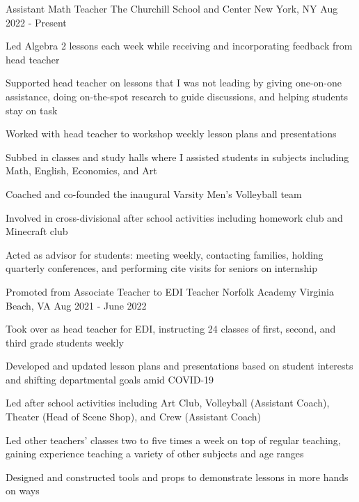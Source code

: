 \begin{cventries}
  \cventry
  {Assistant Math Teacher}
  {The Churchill School and Center}
  {New York, NY}
  {Aug 2022 - Present}
  {
    \begin{cvitems}
      \item {Led Algebra 2 lessons each week while receiving and incorporating feedback from head teacher}
      \item {Supported head teacher on lessons that I was not leading by giving one-on-one assistance, doing on-the-spot research to guide discussions, and helping students stay on task}
      \item {Worked with head teacher to workshop weekly lesson plans and presentations}
      \item {Subbed in classes and study halls where I assisted students in subjects including Math, English, Economics, and Art}
      \item {Coached and co-founded the inaugural Varsity Men's Volleyball team}
      \item {Involved in cross-divisional after school activities including homework club and Minecraft club}
      \item {Acted as advisor for students: meeting weekly, contacting families, holding quarterly conferences, and performing cite visits for seniors on internship}
    \end{cvitems}
  }

  \cventry
  {Promoted from Associate Teacher to EDI Teacher}
  {Norfolk Academy}
  {Virginia Beach, VA}
  {Aug 2021 - June 2022}
  {
    \begin{cvitems}
      \item {Took over as head teacher for EDI, instructing 24 classes of first, second, and third grade students weekly}
      \item {Developed and updated lesson plans and presentations based on student interests and shifting departmental goals amid COVID-19}
      \item {Led after school activities including Art Club, Volleyball (Assistant Coach), Theater (Head of Scene Shop), and Crew (Assistant Coach)}
      \item {Led other teachers' classes two to five times a week on top of regular teaching, gaining experience teaching a variety of other subjects and age ranges}
      \item {Designed and constructed tools and props to demonstrate lessons in more hands on ways}
    \end{cvitems}
  }


\end{cventries}
